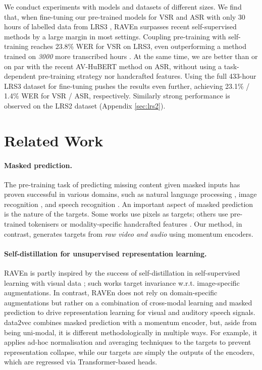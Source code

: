 \documentclass{article} \usepackage{iclr2023_conference,times}
\begin{document}
We conduct experiments with models and datasets of different sizes. We find that, when fine-tuning our pre-trained models for VSR and ASR with only 30 hours of labelled data from LRS3 \citep{afouras2018lrs3}, RAVEn surpasses recent self-supervised methods by a large margin in most settings. Coupling pre-training with self-training reaches 23.8\% WER for VSR on LRS3, even outperforming a method trained on \textit{3000} more transcribed hours \citep{serdyuk2021audio}. At the same time, we are better than or on par with the recent AV-HuBERT method \citep{shi2022learning} on ASR, without using a task-dependent pre-training strategy nor handcrafted features. Using the full 433-hour LRS3 dataset for fine-tuning pushes the results even further, achieving 23.1\% / 1.4\% WER for VSR / ASR, respectively. Similarly strong performance is observed on the LRS2 dataset (Appendix \ref{sec:lrs2}).

\section{Related Work}
\paragraph{Masked prediction.} The pre-training task of predicting missing content given masked inputs has proven successful in various domains, such as natural language processing \citep{devlin2018bert, radford2018improving, radford2019language, brown2020language}, image recognition \citep{he2021masked, xie2021simmim, bao2021beit}, and speech recognition \citep{baevski2020wav2vec, hsu2021hubert, shi2022learning}. An important aspect of masked prediction is the nature of the targets. Some works \citep{he2021masked, xie2021simmim} use pixels as targets; others use pre-trained tokenisers \citep{bao2021beit} or modality-specific handcrafted features \citep{wei2021masked, hsu2021hubert, shi2022learning}. Our method, in contrast, generates targets from \textit{raw video and audio} using momentum encoders. 

\paragraph{Self-distillation for unsupervised representation learning.} RAVEn is partly inspired by the success of self-distillation in self-supervised learning with visual data \citep{grill2020bootstrap, caron2021emerging}; such works target invariance w.r.t. image-specific augmentations. In contrast, RAVEn does not rely on domain-specific augmentations but rather on a combination of cross-modal learning and masked prediction to drive representation learning for visual and auditory speech signals. data2vec \citep{baevski2022data2vec} combines masked prediction with a momentum encoder, but, aside from being uni-modal, it is different methodologically in multiple ways. For example, it applies ad-hoc normalisation and averaging techniques to the targets to prevent representation collapse, while our targets are simply the outputs of the encoders, which are regressed via Transformer-based heads.
\end{document}
